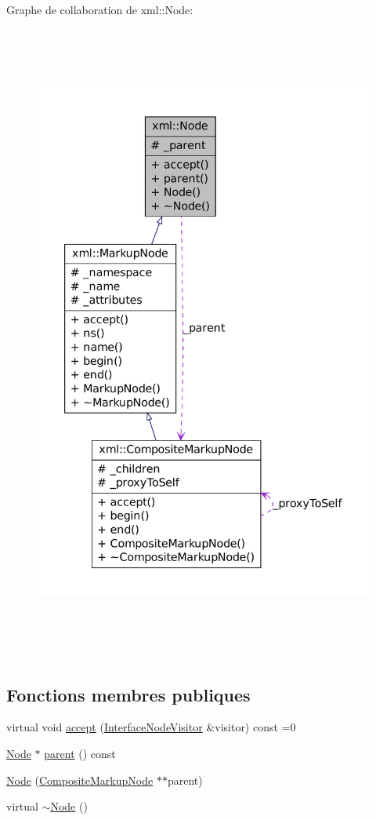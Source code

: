 Graphe de collaboration de xml::Node:
\nopagebreak
\begin{figure}[H]
\begin{center}
\leavevmode
\includegraphics[height=600pt]{classxml_1_1_node__coll__graph}
\end{center}
\end{figure}
\subsection*{Fonctions membres publiques}
\begin{DoxyCompactItemize}
\item 
virtual void \hyperlink{classxml_1_1_node_a332d84602db92c390e57eeec79c4b02d}{accept} (\hyperlink{classxml_1_1_interface_node_visitor}{InterfaceNodeVisitor} \&visitor) const =0
\item 
\hyperlink{classxml_1_1_node}{Node} $\ast$ \hyperlink{classxml_1_1_node_a7b316f796ec1a98f127b6f9e0802b579}{parent} () const 
\item 
\hyperlink{classxml_1_1_node_a79b919ce53463d9b63ad38b6bb934c63}{Node} (\hyperlink{classxml_1_1_composite_markup_node}{CompositeMarkupNode} $\ast$$\ast$parent)
\item 
virtual \hyperlink{classxml_1_1_node_a4529378ae3f081120e846c9d44154f92}{$\sim$Node} ()
\end{DoxyCompactItemize}
